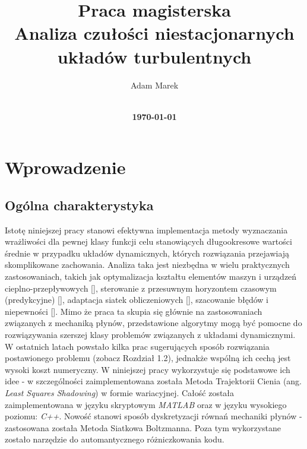 \documentclass[12pt]{article}
\title{
    \vspace*{-3cm}
    \vspace*{5cm}
    {Praca magisterska\bf} \\
    \vspace*{1cm}
    {\bf Analiza czułości niestacjonarnych układów turbulentnych} \\
    \vspace*{2cm}
}
\author{
    \sffamily Adam Marek\\
    \\[6cm]
}
\date{ {\small \bf \today} }
\begin{document}
\maketitle
\newpage
\tableofcontents
\newpage

%
\cleardoublepage


%


%


\section{Wprowadzenie}
\subsection{Ogólna charakterystyka}
Istotę niniejszej pracy stanowi efektywna implementacja metody wyznaczania wrażliwości dla pewnej klasy funkcji celu stanowiących długookresowe wartości średnie w przypadku układów dynamicznych, których rozwiązania przejawiają skomplikowane zachowania. Analiza taka jest niezbędna w wielu praktycznych zastosowaniach, takich jak optymalizacja kształtu elementów maszyn i urządzeń cieplno-przepływowych [], sterowanie z przesuwnym horyzontem czasowym (predykcyjne) [], adaptacja siatek obliczeniowych [], szacowanie błędów i niepewności []. Mimo że praca ta skupia się głównie na zastosowaniach związanych z mechaniką płynów, przedstawione algorytmy mogą być pomocne do rozwiązywania szerszej klasy problemów związanych z układami dynamicznymi.\newline 
W ostatnich latach powstało kilka prac sugerujących sposób rozwiązania postawionego problemu (zobacz Rozdział 1.2), jednakże wspólną ich cechą jest wysoki koszt numeryczny. W niniejszej pracy wykorzystuje się podstawowe ich idee - w szczególności zaimplementowana została Metoda Trajektorii Cienia (ang. \textit{Least Squares Shadowing}) w formie wariacyjnej. Całość została zaimplementowana w języku skryptowym \textit{MATLAB} oraz w języku wysokiego poziomu: \textit{C++}. Nowość stanowi sposób dyskretyzacji równań mechaniki płynów - zastosowana została Metoda Siatkowa Boltzmanna. Poza tym wykorzystane zostało narzędzie do automantycznego różniczkowania kodu.
\end{document}
